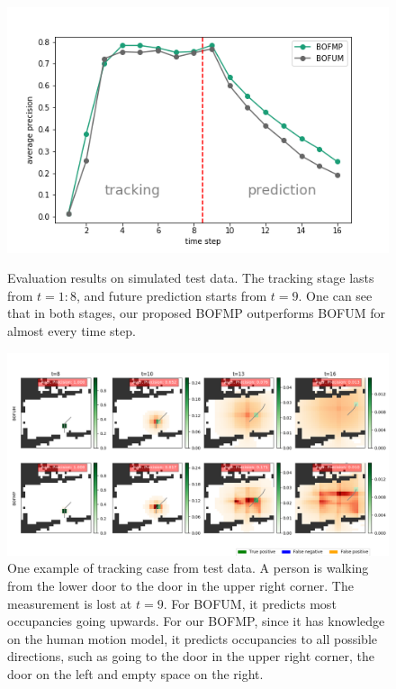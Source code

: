 \begin{figure}[hp]
  \centering
    \includegraphics[width=.8\textwidth]{figures/test_on_simulated_data.png}
    \caption[Evaluation results on simulated test data.]{Evaluation results on simulated test data. The tracking stage lasts from $t=1:8$, and future prediction starts from $t=9$. One can see that in both stages, our proposed BOFMP outperforms BOFUM for almost every time step.}
    \label{fig:simulated_test_data}

    \vspace*{\floatsep}

    \includegraphics[width=\textwidth]{figures/tracking_sample_for_simulated_data.png}
    \caption[One example of tracking case from simulated test data.]{One example of tracking case from test data. A person is walking from the lower door to the door in the upper right corner. The measurement is lost at $t=9$. For BOFUM, it predicts most occupancies going upwards. For our BOFMP, since it has knowledge on the human motion model, it predicts occupancies to all possible directions, such as going to the door in the upper right corner, the door on the left and empty space on the right.}
    \label{fig:tracking_simulated_data}
\end{figure}

